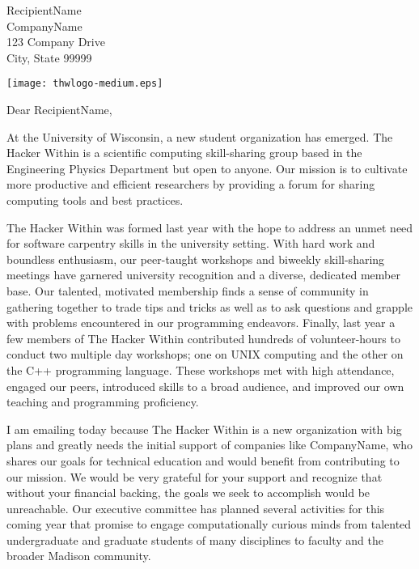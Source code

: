 \documentclass{letter}
\begin{document}
%
%


 \begin{letter}{RecipientName\\
CompanyName\\
123 Company Drive\\
City, State 99999
}
\begin{center}
\texttt{[image: thwlogo-medium.eps]}
\end{center}
	\opening{Dear RecipientName,}

At the University of Wisconsin, a new student organization has emerged. The Hacker Within is a scientific computing skill-sharing group based in the Engineering Physics Department but open to anyone. Our mission is to cultivate more productive and efficient researchers by providing a forum for sharing computing tools and best practices.

The Hacker Within was formed last year with the hope to address an unmet need for software carpentry skills in the university setting. With hard work and boundless enthusiasm, our peer-taught workshops and biweekly skill-sharing meetings have garnered university recognition and a diverse, dedicated member base. Our talented, motivated membership finds a sense of community in gathering together to trade tips and tricks as well as to ask questions and grapple with problems encountered in our programming endeavors. Finally, last year a few members of The Hacker Within contributed hundreds of volunteer-hours to conduct two multiple day workshops; one on UNIX computing and the other on the C++ programming language. These workshops met with high attendance, engaged our peers, introduced skills to a broad audience, and improved our own teaching and programming proficiency.

I am emailing today because The Hacker Within is a new organization with big plans and greatly needs the initial support of companies like CompanyName, who shares our goals for technical education and would benefit from contributing to our mission. We would be very grateful for your support and recognize that without your financial backing, the goals we seek to accomplish would be unreachable. Our executive committee has planned several activities for this coming year that promise to engage computationally curious minds from talented undergraduate and graduate students of many disciplines to faculty and the broader Madison community.


\end{letter}
\end{document}

